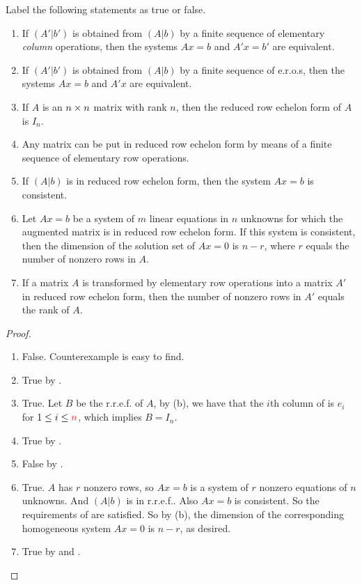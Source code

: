 \exercisesection

\begin{exercise} \label{exercise 3.4.1}
Label the following statements as true or false.
\begin{enumerate}
\item If \((A'|b')\) is obtained from \((A|b)\) by a finite sequence of elementary \emph{column} operations, then the systems \(Ax = b\) and \(A'x = b'\) are equivalent.
\item If \((A'|b')\) is obtained from \((A|b)\) by a finite sequence of e.r.o.s, then the systems \(Ax = b\) and \(A' x\) are equivalent.
\item If \(A\) is an \(n \times n\) matrix with rank \(n\), then the reduced row echelon form of \(A\) is \(I_n\).
\item Any matrix can be put in reduced row echelon form by means of a finite sequence of elementary row operations.
\item If \((A|b)\) is in reduced row echelon form, then the system \(Ax = b\) is consistent.
\item Let \(Ax = b\) be a system of \(m\) linear equations in \(n\) unknowns for which the augmented matrix is in reduced row echelon form.
If this system is consistent, then the dimension of the solution set of \(Ax = 0\) is \(n - r\), where \(r\) equals the number of nonzero rows in \(A\).
\item If a matrix \(A\) is transformed by elementary row operations into a matrix \(A'\) in reduced row echelon form, then the number of nonzero rows in \(A'\) equals the rank of \(A\).
\end{enumerate}
\end{exercise}

\begin{proof} \ 

\begin{enumerate}
\item False. Counterexample is easy to find.
\item True by .
\item True. Let \(B\) be the r.r.e.f. of \(A\), by (b), we have that the \(i\)th column of is \(e_i\) for \(1 \le i \le \RED{n}\), which implies \(B = I_n\).
\item True by .
\item False by .
\item True.
    \(A\) has \(r\) nonzero rows, so \(Ax = b\) is a system of \(r\) nonzero equations of \(n\) unknowns.
    And \((A|b)\) is in r.r.e.f..
    Also \(Ax = b\) is consistent.
    So the requirements of  are satisfied.
    So by (b), the dimension of the corresponding homogeneous system \(Ax = 0\) is \(n - r\), as desired.
\item True by  and .
\end{enumerate}
\end{proof}

